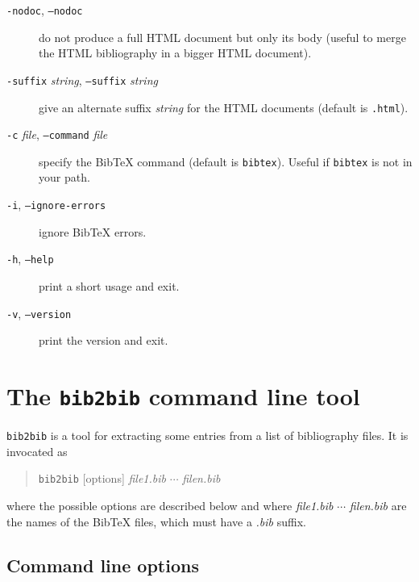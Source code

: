 \documentclass[11pt,a4paper]{article}
\begin{document}
\begin{description}
  
\item[\texttt{-nodoc}, \texttt{--nodoc}] do not produce a full HTML
  document but only its body (useful to merge the HTML bibliography in
  a bigger HTML document).

  
\item[\texttt{-suffix} \textit{string}, \texttt{--suffix}
  \textit{string}] give an alternate suffix \textit{string} for the
  HTML documents (default is \texttt{.html}).

    
\item[\texttt{-c} \textit{file}, \texttt{--command} \textit{file}]
  specify the BibTeX command (default is \texttt{bibtex}).  Useful if
  \texttt{bibtex} is not in your path.

  
\item[\texttt{-i}, \texttt{--ignore-errors}] ignore BibTeX errors.

  
\item[\texttt{-h}, \texttt{--help}] print a short usage and exit.

  
\item[\texttt{-v}, \texttt{--version}] print the version and exit.


\end{description}


\section{The \texttt{bib2bib} command line tool}

\texttt{bib2bib} is a tool for extracting some entries from a list of
bibliography files. It is invocated as 
\begin{quote}
\texttt{bib2bib} [options] \textit{file1.bib} $\cdots$ \textit{filen.bib}
\end{quote}
where the possible 
options
are described below and where
\textit{file1.bib} $\cdots$ \textit{filen.bib} are the names of the
BibTeX files, which must have a \textit{.bib} suffix.

\subsection{Command line options}
\end{document}
